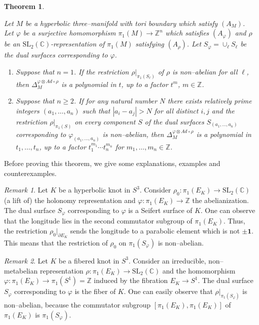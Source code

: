 \documentclass[a4paper]{amsart}
\theoremstyle{plain}
\newtheorem{theorem}{Theorem}
\theoremstyle{definition}
\theoremstyle{remark}
\newtheorem{remark}{Remark}%
\newcommand{\mygeq}{\geqslant}
\newcommand{\ZZ}{{\mathbb Z}}
\newcommand{\CC}{{\mathbb C}}
\newcommand{\SL}{{\mathrm{SL}_2(\CC)}}
\newcommand{\I}{\mathbf{1}}
\newcommand{\PolyTors}[2]{\Delta_{#1}^{#2}}
\newcommand{\otAd}[2]{#1 \otimes Ad \circ #2}
\newcommand{\bord}{\partial}
\begin{document}
\begin{theorem}\label{theorem:poly}

  Let $M$ be a hyperbolic three--manifold with
  tori boundary which satisfy $(A_M)$.  Let $\varphi$ be a surjective
  homomorphism $\pi_1(M) \to \ZZ^n$ which satisfies $(A_\varphi)$ and
  $\rho$ be an $\SL$-representation of $\pi_1(M)$ satisfying
  $(A_\rho)$.
  Let $S_\varphi = \cup_\ell S_\ell$ be the dual surfaces corresponding to
  $\varphi$.

  \begin{enumerate}
  \item Suppose that $n=1$. If the restriction $\rho|_{\pi_1(S_\ell)}$ of
    $\rho$ is non--abelian for all $\ell$, then $\PolyTors{M}{\otAd{\varphi}{\rho}}$
    is a polynomial in $t$, up to a factor $t^m$, $m \in \ZZ$.
  \item Suppose that $n \mygeq 2$. If for any natural number $N$ there
    exists relatively prime integers $(a_1, \ldots, a_n)$ such that
    $|a_i - a_j| > N$ for all distinct $i, j$ and the restriction
    $\rho|_{\pi_1(S)}$ on every component $S$ of the dual surfaces
    $S_{(a_1, \ldots, a_n)}$ corresponding to $\varphi_{(a_1, \ldots,
      a_n)}$ is non--abelian, then
    $\PolyTors{M}{\otAd{\varphi}{\rho}}$ is a polynomial in $t_1,
    \ldots, t_n$, up to a factor $t_1^{m_1} \cdots t_n^{m_n}$ for
    $m_1, \ldots, m_n \in \ZZ$.
  \end{enumerate}

\end{theorem}


Before proving this theorem, we give some explanations, examples and
counterexamples.

\begin{remark}
  Let $K$ be a hyperbolic knot in $S^3$. Consider $\rho_0 \colon
  \pi_1(E_K) \to \SL$ (a lift of) the holonomy representation and
  $\varphi \colon \pi_1(E_K) \to \ZZ$ the abelianization. The dual
  surface $S_\varphi$ corresponding to $\varphi$ is a Seifert surface of $K$. One can observe that the longitude 
  lies in the second commutator subgroup of $\pi_1(E_K)$. Thus,
  the restriction $\rho_0|_{\bord E_K}$ sends the longitude to a
  parabolic element which is not $\pm \I$.  This means that the
  restriction of $\rho_0$ on $\pi_1(S_\varphi)$ is non--abelian.
\end{remark}

\begin{remark}
  Let $K$ be a fibered knot in $S^3$. Consider an irreducible,
  non--metabelian representation $\rho \colon \pi_1(E_K) \to \SL$ and
  the homomorphism $\varphi \colon \pi_1(E_K) \to \pi_1(S^1) =\ZZ$
  induced by the fibration $E_K \to S^1$. The dual surface
  $S_\varphi$ corresponding to $\varphi$ is the fiber of $K$. One can easily
  observe that $\rho|_{\pi_1(S_\varphi)}$ is non--abelian, because the commutator
  subgroup $[\pi_1(E_K), \pi_1(E_K)]$ of $\pi_1(E_K)$ is $\pi_1(S_\varphi)$.
\end{remark}
\end{document}
